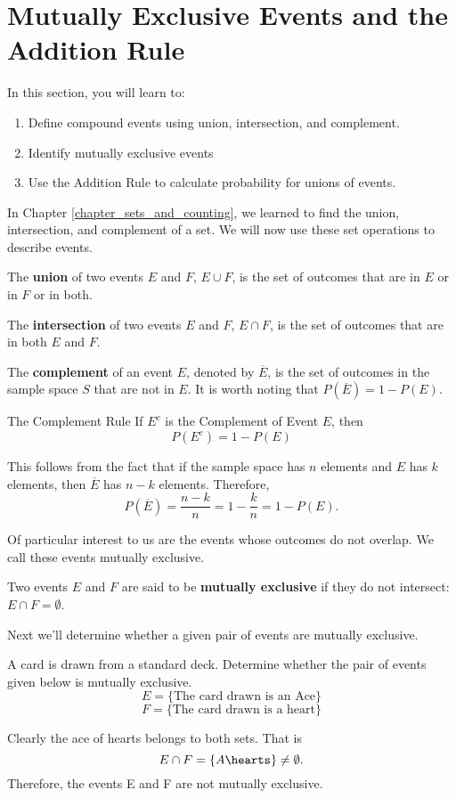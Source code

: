 \section{Mutually Exclusive Events and the Addition Rule}

In this section, you will learn to:
\begin{enumerate}
    \item Define compound events using union, intersection, and complement.
    \item Identify mutually exclusive events
    \item Use the Addition Rule to calculate probability for unions of events.
\end{enumerate}

In Chapter \ref{chapter_sets_and_counting}, we learned to find the union, intersection, and complement of a set. We will now use these set operations to describe events.

The \textbf{union} of two events \(E\) and \(F\), \(E \cup F\), is the set of outcomes that are in \(E\) or in \(F\) or in both.

The \textbf{intersection} of two events \(E\) and \(F\), \(E \cap F\), is the set of outcomes that are in both \(E\) and \(F\).

The \textbf{complement} of an event \(E\), denoted by \(\overline{E}\), is the set of outcomes in the sample space \(S\) that are not in \(E\). It is worth noting that \(P(\overline{E}) = 1 - P(E)\).

\begin{summarybox}{The Complement Rule}
    If \(E^c\) is the Complement of Event \(E\), then
    \[ P(E^c) = 1 - P(E) \]
\end{summarybox}


This follows from the fact that if the sample space has \(n\) elements and \(E\) has \(k\) elements, then \(\overline{E}\) has \(n - k\) elements. Therefore,
\[
    P\left(\overline{E}\right) = \frac{n - k}{n} = 1 - \frac{k}{n} = 1 - P(E).
\]

Of particular interest to us are the events whose outcomes do not overlap. We call these events mutually exclusive.

Two events \(E\) and \(F\) are said to be \textbf{mutually exclusive} if they do not intersect: \(E \cap F = \emptyset\).

Next we'll determine whether a given pair of events are mutually exclusive.

\begin{example}
    A card is drawn from a standard deck. Determine whether the pair of events given below is mutually exclusive.
    \[ E = \{\text{The card drawn is an Ace}\} \]
    \[ F = \{\text{The card drawn is a heart}\} \]
\end{example}
\begin{solution}
    Clearly the ace of hearts belongs to both sets. That is
    \[ E \cap F = \{A\hearts\} \neq \emptyset. \]
    Therefore, the events E and F are not mutually exclusive.
\end{solution}

